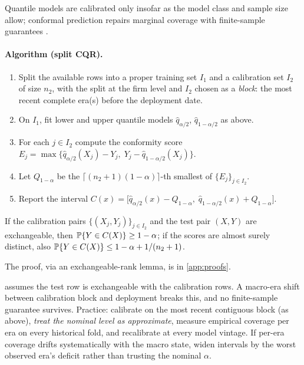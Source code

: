 Quantile models are calibrated only insofar as the model class and sample size allow; conformal
prediction repairs marginal coverage with finite-sample guarantees \citep{romano2019}.

\paragraph{Algorithm (split CQR).}
\begin{enumerate}
\item Split the available rows into a proper training set $I_1$ and a calibration set $I_2$ of
size $n_2$, with the split at the firm level and $I_2$ chosen as a \emph{block}: the most recent
complete era(s) before the deployment date.
\item On $I_1$, fit lower and upper quantile models $\hat q_{\alpha/2}$, $\hat q_{1-\alpha/2}$
as above.
\item For each $j \in I_2$ compute the conformity score $E_j = \max\bigl\{\hat q_{\alpha/2}(X_j)
- Y_j,\; Y_j - \hat q_{1-\alpha/2}(X_j)\bigr\}$.
\item Let $Q_{1-\alpha}$ be the $\lceil (n_2+1)(1-\alpha) \rceil$-th smallest of $\{E_j\}_{j \in
I_2}$.
\item Report the interval $C(x) = \bigl[\hat q_{\alpha/2}(x) - Q_{1-\alpha},\; \hat
q_{1-\alpha/2}(x) + Q_{1-\alpha}\bigr]$.
\end{enumerate}

\begin{theorem}
\label{thm:xgb-cqr} If the calibration pairs $\{(X_j, Y_j)\}_{j \in I_2}$ and the test pair $(X,
Y)$ are exchangeable, then $\mathbb{P}\{Y \in C(X)\} \ge 1 - \alpha$; if the scores are almost surely
distinct, also $\mathbb{P}\{Y \in C(X)\} \le 1 - \alpha + 1/(n_2 + 1)$.
\end{theorem}

The proof, via an exchangeable-rank lemma, is in \cref{app:proofs}.

\begin{warning}\label{warn:xgb-exch}
 assumes the test row is exchangeable with the calibration rows. A macro-era
shift between calibration block and deployment breaks this, and no finite-sample guarantee
survives. Practice: calibrate on the most recent contiguous block (as above), \emph{treat the
nominal level as approximate}, measure empirical coverage per era on every historical fold, and
recalibrate at every model vintage. If per-era coverage drifts systematically with the macro
state, widen intervals by the worst observed era's deficit rather than trusting the nominal
$\alpha$.
\end{warning}

